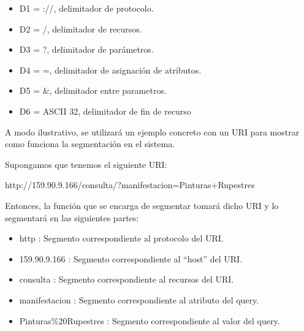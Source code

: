 \begin{itemize}
\item D1 = ://, delimitador de protocolo.
\item D2 = /, delimitador de recursos.
\item D3 = ?, delimitador de parámetros.
\item D4 = =, delimitador de asignación de atributos.
\item D5 = \&, delimitador entre parametros.
\item D6 = ASCII 32, delimitador de fin de recurso
\end{itemize}

A modo ilustrativo, se utilizará un ejemplo concreto con un URI para mostrar como funciona la segmentación en el sistema.

Supongamos que tenemos el siguiente URI:

http://159.90.9.166/consulta/?manifestacion=Pinturas+Rupestres

Entonces, la función que se encarga de segmentar tomará dicho URI y lo segmentará en las siguientes partes:

\begin{itemize}
\item http : Segmento correspondiente al protocolo del URI. 
\item 159.90.9.166 : Segmento correspondiente al ``host'' del URI. 
\item consulta : Segmento correspondiente al recursos del URI.
\item manifestacion : Segmento correspondiente al atributo del query.
\item Pinturas\%20Rupestres : Segmento correspondiente al valor del query.  
\end{itemize}

















 



